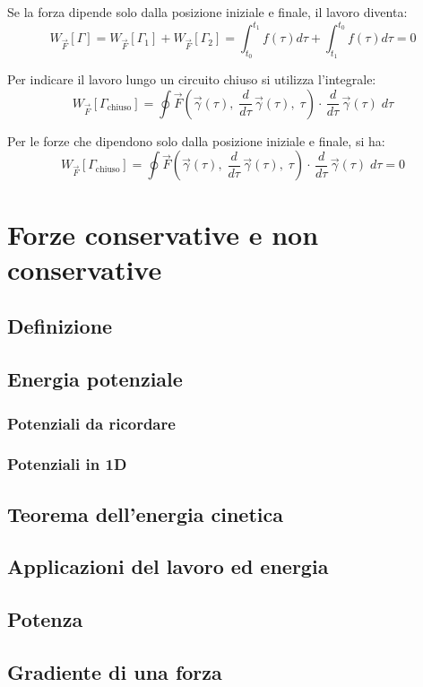 \documentclass[a4paper]{article}
\newcommand\dtau{\frac{d}{d\tau}\,}
\begin{document}
Se la forza dipende solo dalla posizione iniziale e finale, il lavoro diventa:
\[W_{\vec{F}}[\Gamma] = W_{\vec{F}}[\Gamma_1] + W_{\vec{F}}[\Gamma_2] = \int_{t_0}^{t_1}f(\tau) d\tau + \int_{t_1}^{t_0}f(\tau) d\tau = 0\]

Per indicare il lavoro lungo un circuito chiuso si utilizza l'integrale:
\[W_{\vec{F}}[\Gamma_\text{chiuso}] = \oint \vec{F}\left(\vec{\gamma}(\tau), \; \dtau \vec{\gamma}(\tau), \; \tau\right) \cdot \, \dtau \vec{\gamma}(\tau) \; d\tau\]

Per le forze che dipendono solo dalla posizione iniziale e finale, si ha:
\[W_{\vec{F}}[\Gamma_\text{chiuso}] = \oint \vec{F}\left(\vec{\gamma}(\tau), \; \dtau \vec{\gamma}(\tau), \; \tau\right) \cdot \, \dtau \vec{\gamma}(\tau) \; d\tau = 0\]

\newpage

\section{Forze conservative e non conservative}
\subsection{Definizione}
\subsection{Energia potenziale}
\subsubsection*{Potenziali da ricordare}
\subsubsection*{Potenziali in 1D}
\subsection{Teorema dell'energia cinetica}
\subsection{Applicazioni del lavoro ed energia}
\subsection{Potenza}
\subsection{Gradiente di una forza}
\end{document}
